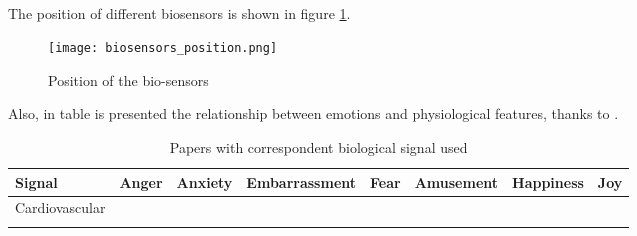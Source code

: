 \\
The position of different biosensors is shown in figure \ref{fig:biosensors_position}.
\begin{figure}[h]
    \centering
    \texttt{[image: biosensors\_position.png]} 
	\caption{Position of the bio-sensors}
    \label{fig:biosensors_position}
\end{figure}
Also, in table is presented the relationship between emotions and physiological features, thanks to \cite{shu2018review}.
\begin{table}[h!]
	\centering
	\begin{tabular}{|l|l|l|l|l|l|l|l|}
		\hline
		Signal & Anger & Anxiety & Embarrassment & Fear & Amusement & Happiness & Joy\\ [0.5ex] 
		\hline \hline Cardiovascular &&&&&&& \\ 
		\hline  \\
		
		\hline
	\end{tabular}
	\caption{Papers with correspondent biological signal used}
	\label{table:biological_signals}
\end{table}





